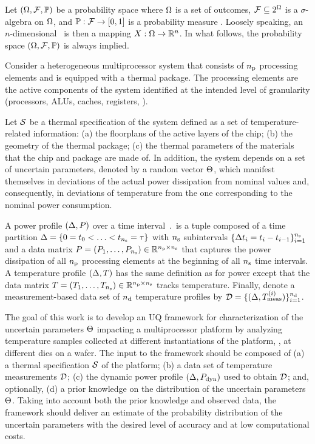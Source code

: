 Let $(\Omega, \mathcal{F}, \mathbb{P})$ be a probability space where $\Omega$ is a set of outcomes, $\mathcal{F} \subseteq 2^\Omega$ is a $\sigma$-algebra on $\Omega$, and $\mathbb{P}: \mathcal{F} \to [0, 1]$ is a probability measure \cite{durrett2010}. Loosely speaking, an $n$-dimensional \rv\ is then a mapping $X: \Omega \to \mathbb{R}^n$. In what follows, the probability space $(\Omega, \mathcal{F}, \mathbb{P})$ is always implied.

Consider a heterogeneous multiprocessor system that consists of ${n_\text{p}}$ processing elements and is equipped with a thermal package. The processing elements are the active components of the system identified at the intended level of granularity (processors, ALUs, caches, registers, \etc).

Let $\mathcal{S}$ be a thermal specification of the system defined as a set of temperature-related information: (a) the floorplans of the active layers of the chip; (b) the geometry of the thermal package; (c) the thermal parameters of the materials that the chip and package are made of. In addition, the system depends on a set of uncertain parameters, denoted by a random vector $\Theta$, which manifest themselves in deviations of the actual power dissipation from nominal values and, consequently, in deviations of temperature from the one corresponding to the nominal power consumption.

A power profile $\profileP$ over a time interval $\period$ is a tuple composed of a time partition $\Delta = \{ 0 = t_0 < \dotsc < t_{n_\text{s}} = \tau \}$ with $n_\text{s}$ subintervals $\{ \Delta t_i = t_i - t_{i - 1} \}_{i = 1}^{n_\text{s}}$ and a data matrix $P = \left(P_1, \dotsc, P_{n_\text{s}} \right) \in \mathbb{R}^{{n_\text{p}} \times n_\text{s}}$ that captures the power dissipation of all ${n_\text{p}}$ processing elements at the beginning of all $n_\text{s}$ time intervals. A temperature profile $\profileT$ has the same definition as for power except that the data matrix $T = \left( T_1, \dots, T_{n_\text{s}} \right) \in \mathbb{R}^{{n_\text{p}} \times n_\text{s}}$ tracks temperature. Finally, denote a measurement-based data set of $n_\text{d}$ temperature profiles by $\mathcal{D} = \{ (\Delta, T^{(i)}_{\text{meas}}) \}_{i = 1}^{n_\text{d}}$.

The goal of this work is to develop an UQ framework for characterization of the uncertain parameters $\Theta$ impacting a multiprocessor platform by analyzing temperature samples collected at different instantiations of the platform, \eg, at different dies on a wafer. The input to the framework should be composed of (a) a thermal specification $\mathcal{S}$ of the platform; (b) a data set of temperature measurements $\mathcal{D}$; (c) the dynamic power profile $\left(\Delta, P_{\text{dyn}}\right)$ used to obtain $\mathcal{D}$; and, optionally, (d) a prior knowledge on the distribution of the uncertain parameters $\Theta$. Taking into account both the prior knowledge and observed data, the framework should deliver an estimate of the probability distribution of the uncertain parameters with the desired level of accuracy and at low computational costs.
